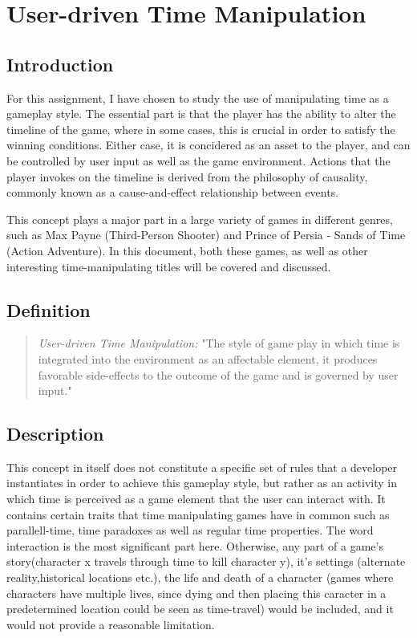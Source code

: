 \chapter{User-driven Time Manipulation}

\section{Introduction}

For this assignment, I have chosen to study the use of manipulating time as a gameplay style. The essential part is that the player has the ability to alter the timeline of the game, where in some cases, this is crucial in order to satisfy the winning conditions. Either case, it is concidered as an asset to the player, and can be controlled by user input as well as the game environment. Actions that the player invokes on the timeline is derived from the philosophy of causality, commonly known as a cause-and-effect relationship between events.

This concept plays a major part in a large variety of games in different genres, such as Max Payne (Third-Person Shooter) and Prince of Persia - Sands of Time (Action Adventure). In this document, both these games, as well as other interesting time-manipulating titles will be covered and discussed. 

\section{Definition}

\begin{quote}
\emph{User-driven Time Manipulation:} "The style of game play in which time is integrated into the environment as an affectable element, it produces favorable side-effects to the outcome of the game and is governed by user input." 
\end{quote}

\section{Description}

This concept in itself does not constitute a specific set of rules that a developer instantiates in order to achieve this gameplay style, 
but rather as an activity in which time is perceived as a game element that the user can interact with. It contains certain traits that time manipulating games have in common such as parallell-time, time paradoxes as well as regular time properties. 
The word interaction is the most significant part here. Otherwise, any part of a game's story(character x travels 
through time to kill character y), it's settings (alternate reality,historical locations etc.), the life and death of a 
character (games where characters have multiple lives, since dying and then placing this caracter in a predetermined 
location could be seen as time-travel) would be included, and it would not provide a reasonable limitation. 

